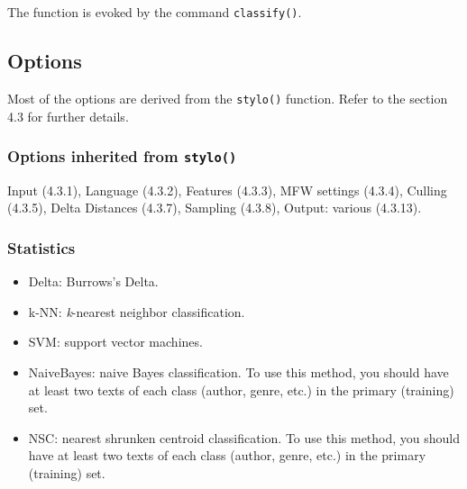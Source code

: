 \documentclass[11pt,a4paper]{article}
\def\margin#1{\marginpar{\textcolor{blue}{\footnotesize\tt #1}}}
\def\code#1{{\tt #1}}
\begin{document}
The function is evoked by the command \code{classify()}.


\subsection{Options}

Most of the options are derived from the \code{stylo()} function.
Refer to the section 4.3 for further details.


\subsubsection{Options inherited from \code{stylo()}}

Input (4.3.1), Language (4.3.2), Features (4.3.3), MFW settings (4.3.4),
Culling (4.3.5), Delta Distances (4.3.7), Sampling (4.3.8), Output:
various (4.3.13).


\subsubsection{Statistics}
\begin{itemize}
\item Delta:\margin{classification.method=}\margin{"delta"}
Burrows's Delta. 

\item k-NN:\margin{"knn"} \textit{k}-nearest neighbor
classification. 

\item SVM:\margin{"svm"} support vector machines. 

\item NaiveBayes:\margin{"naivebayes"} naive
Bayes classification. To use this method, you should have at least
two texts of each class (author, genre, etc.) in the primary (training)
set. 

\item NSC:\margin{"nsc"} nearest shrunken
centroid classification. To use this method, you should have at least
two texts of each class (author, genre, etc.) in the primary (training)
set. 
\end{itemize}
\end{document}
